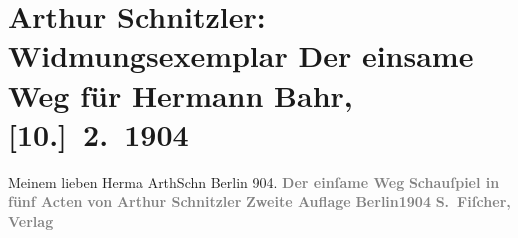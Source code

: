 

         
         \renewcommand{\erwaehntePersonen}{Personen: Hermann Bahr}
         \renewcommand{\erwaehnteInstitutionen}{Institutionen: S. Fischer Verlag}
         \renewcommand{\erwaehnteOrte}{Orte: Berlin, Wien}
         \renewcommand{\erwaehnteWerke}{Werke: Der einsame Weg. Schauspiel in fünf Akten}
               \section[Arthur Schnitzler: Widmungsexemplar Der einsame Weg für Hermann Bahr, {[}10.{]} 2. 1904]{ Arthur Schnitzler: Widmungsexemplar Der einsame Weg für Hermann Bahr,
               {[}10.{]} 2. 1904}\nopagebreak{}\rehead{ }\begin{ledgroupsized}[t]{13cm}\normalsize\beginnumbering \toendnotes[C]{\smallbreak\pagebreak[2]} 
\toendnotes[C]{\smallbreak}\pstart
           \noindent{}{\pb}Meinem lieben Herma{\geminationn}\pend
           \pstart \spacefill\mbox{ArthSchn}\pend{}\pstart
           \noindent{}Berlin\label{K_L01371_1v}\label{K_L01371_1h} 904. \pend
           {\bigskip}\pstart
           \noindent{}\centering{}{\pb}\textcolor{gray}{\textbf{Der einſame Weg}}\pend
           \pstart
           \noindent{}\centering{}\textcolor{gray}{\textbf{Schauſpiel in fünf Acten}}\pend
           \pstart
           \noindent{}\centering{}\textcolor{gray}{\textbf{von}}\pend
           \pstart
           \noindent{}\centering{}\textcolor{gray}{\textbf{Arthur Schnitzler}}\pend
           {\bigskip}\pstart
           \noindent{}\centering{}\textcolor{gray}{\textbf{Zweite Auflage}}\pend
           \pstart
           \noindent{}\centering{}\textcolor{gray}{\textbf{Berlin1904}}\pend
           \pstart
           \noindent{}\centering{}\textcolor{gray}{\textbf{S. Fiſcher, Verlag}}\pend
           
         
         \endnumbering{}\end{ledgroupsized}  \newcommand{\dateiname}{L01371}\newcommand{\titel}{Arthur Schnitzler: Widmungsexemplar Der einsame Weg für Hermann Bahr, [10.] 2. 1904}\newcommand{\editorInnen}{ Kurt Ifkovits,  Martin Anton Müller}
      